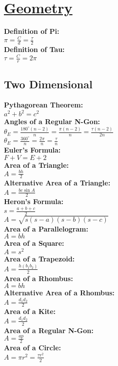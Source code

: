 \documentclass[12pt]{article}
\begin{document}
\section*{\underline{Geometry}}
\textbf{Definition of Pi:}
    \\ \( \pi = \displaystyle\frac{ C }{ d } = \displaystyle\frac{ \tau }{ 2 } \)
\\ \textbf{Definition of Tau:}
    \\ \( \tau = \displaystyle\frac{ C }{ r } = 2 \pi \)

\subsection*{Two Dimensional}
\textbf{Pythagorean Theorem:}
    \\ \( a^2 + b^2 = c^2 \)
\\ \textbf{Angles of a Regular N-Gon:}
    \\ \( \theta_E = \displaystyle\frac{ 180^\circ ( n - 2 ) }{ n } = \displaystyle\frac{ \pi ( n - 2 ) }{ n } = \displaystyle\frac{ \tau ( n - 2 ) }{ 2n } \)
    \\ \( \theta_E = \displaystyle\frac{ 360^\circ }{ n } = \displaystyle\frac{ 2 \pi }{ n } = \displaystyle\frac{ \tau }{ n } \)
\\ \textbf{Euler's Formula:}
    \\ \( F + V = E + 2 \)
\\ \textbf{Area of a Triangle:}
    \\ \( A = \displaystyle\frac{ bh }{ 2 } \)
\\ \textbf{Alternative Area of a Triangle:}
    \\ \( A = \displaystyle\frac{ bc \sin A }{ 2 } \)
\\ \textbf{Heron's Formula:}
    \\ \( s = \displaystyle\frac{ a + b + c }{ 2 } \)
    \\ \( A = \sqrt{ s( s - a )( s - b )( s - c ) } \)
\\ \textbf{Area of a Parallelogram:}
    \\ \( A = bh \)
\\ \textbf{Area of a Square:}
    \\ \( A = s^2 \)
\\ \textbf{Area of a Trapezoid:}
    \\ \( A = \displaystyle\frac{ h( b_1 b_2 ) }{ 2 } \)
\\ \textbf{Area of a Rhombus:}
    \\ \( A = bh \)
\\ \textbf{Alternative Area of a Rhombus:}
    \\ \( A = \displaystyle\frac{ d_1 d_2 }{ 2 } \)
\\ \textbf{Area of a Kite:}
    \\ \( A = \displaystyle\frac{ d_1 d_2 }{ 2 } \)
\\ \textbf{Area of a Regular N-Gon:}
    \\ \( A = \displaystyle\frac{ ap }{ 2 } \)
\\ \textbf{Area of a Circle:}
    \\ \( A = \pi r^2 = \displaystyle\frac{ \tau r^2 }{ 2 } \)
\end{document}
